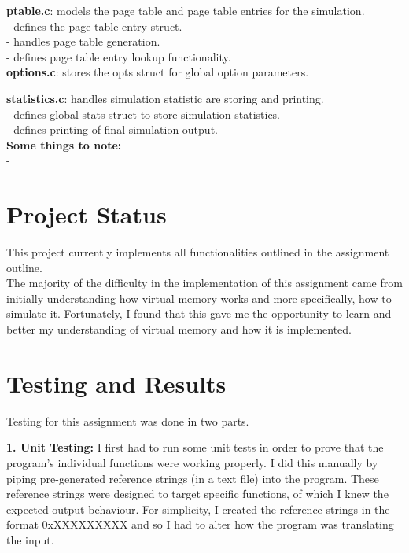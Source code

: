 \documentclass{article}
\begin{document}
\noindent
\textbf{ptable.c}: models the page table and page table entries for the simulation. \\
- defines the page table entry struct. \\
- handles page table generation. \\
- defines page table entry lookup functionality. \\

\noindent
\textbf{options.c}: stores the opts struct for global option parameters.

\noindent
\textbf{statistics.c}: handles simulation statistic are storing and printing. \\
- defines global stats struct to store simulation statistics. \\
- defines printing of final simulation output. \\

\noindent
\textbf{ Some things to note: } \\
- \\

\section{Project Status}
This project currently implements all functionalities outlined in the
assignment outline. \\

\noindent
The majority of the difficulty in the implementation of this
assignment came from initially understanding how virtual memory works and
more specifically, how to simulate it.
Fortunately, I found that this gave me the opportunity to learn and
better my understanding of virtual memory and how it is implemented. \\

\section{Testing and Results}

\noindent
Testing for this assignment was done in two parts.

\noindent
\textbf{1. Unit Testing:}
I first had to run some unit tests in order to prove that the program's individual
functions were working properly. I did this manually by piping pre-generated
reference strings (in a text file) into the program. These reference strings
were designed to target specific functions, of which I knew the expected output
behaviour. For simplicity, I created the reference strings in the format 0xXXXXXXXXX
and so I had to alter how the program was translating the input. \\
\end{document}
